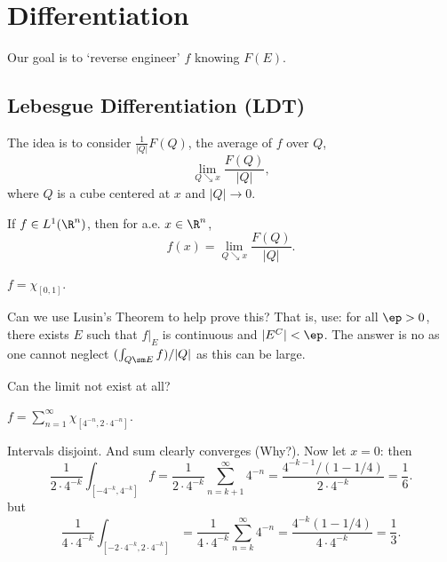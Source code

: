 \newpage
\section{Differentiation}




Our goal is to `reverse engineer' $f$ knowing $F(E)$. 


\subsection{Lebesgue Differentiation (LDT)}



The idea is to consider $\frac{1}{|Q|} F(Q)$, the average of $f$ over $Q$, 
	\[
	\lim_{Q \searrow x} \dfrac{F(Q)}{|Q|},
	\]
where $Q$ is a cube centered at $x$ and $|Q| \to 0$. 


\begin{thm}
If $f \in L^1(\R^n)$, then for a.e. $x \in \R^n$, 
	\[
	f(x)=\lim_{Q \searrow x} \dfrac{F(Q)}{|Q|}.
	\]
\end{thm}


\begin{ex}
$f= \chi_{[0,1]}$. 
\end{ex}


Can we use Lusin's Theorem to help prove this? That is, use: for all $\ep>0$, there exists $E$ such that $f \big|_E$ is continuous and $|E^C|<\ep$. The answer is no as one cannot neglect $(\int_{Q \sm E} f)/|Q|$ as this can be large. 


Can the limit not exist at all?

\begin{ex}
$f= \sum_{n=1}^\infty \chi_{[4^{-n}, 2 \cdot 4^{-n}]}$.

Intervals disjoint. And sum clearly converges (Why?). Now let $x=0$: then 
	\[
	\dfrac{1}{2 \cdot 4^{-k}} \int_{[-4^{-k},4^{-k}]} f = \dfrac{1}{2 \cdot 4^{-k}} \sum_{n=k+1}^\infty 4^{-n}= \dfrac{4^{-k-1}/(1-1/4)}{2 \cdot 4^{-k}}= \dfrac{1}{6}.
	\]
but
	\[
	\dfrac{1}{4 \cdot 4^{-k}} \int_{[-2 \cdot 4^{-k}, 2 \cdot 4^{-k}]}= \dfrac{1}{4 \cdot 4^{-k}} \sum_{n=k}^\infty 4^{-n}= \dfrac{4^{-k}(1-1/4)}{4 \cdot 4^{-k}}= \dfrac{1}{3}. 
	\]
\end{ex}


